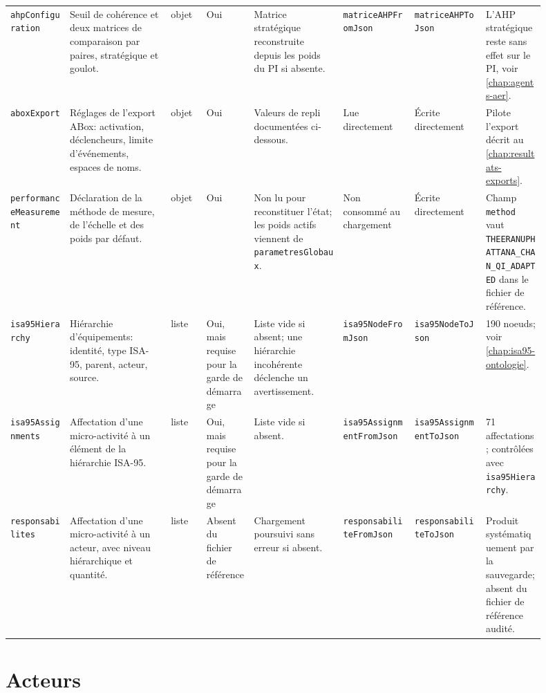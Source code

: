 \begin{landscape}
{\begin{longtable}{L{0.10\linewidth} L{0.17\linewidth} L{0.06\linewidth} L{0.08\linewidth} L{0.15\linewidth} L{0.12\linewidth} L{0.12\linewidth} L{0.10\linewidth}}
\texttt{ahp\allowbreak Configuration} & Seuil de cohérence et deux matrices de comparaison par paires, stratégique et goulot. & objet & Oui & Matrice stratégique reconstruite depuis les poids du PI si absente. & \texttt{matriceAHP\allowbreak FromJson} & \texttt{matriceAHP\allowbreak ToJson} & L'AHP stratégique reste sans effet sur le PI, voir \cref{chap:agents-aer}. \\
\texttt{aboxExport} & Réglages de l'export ABox: activation, déclencheurs, limite d'événements, espaces de noms. & objet & Oui & Valeurs de repli documentées ci-dessous. & Lue directement & Écrite directement & Pilote l'export décrit au \cref{chap:resultats-exports}. \\
\texttt{performance\allowbreak Measurement} & Déclaration de la méthode de mesure, de l'échelle et des poids par défaut. & objet & Oui & Non lu pour reconstituer l'état; les poids actifs viennent de \texttt{parametres\allowbreak Globaux}. & Non consommé au chargement & Écrite directement & Champ \texttt{method} vaut \texttt{THEERANUPHATTANA\_\allowbreak CHAN\_QI\_\allowbreak ADAPTED} dans le fichier de référence. \\
\texttt{isa95\allowbreak Hierarchy} & Hiérarchie d'équipements: identité, type ISA-95, parent, acteur, source. & liste & Oui, mais requise pour la garde de démarrage & Liste vide si absent; une hiérarchie incohérente déclenche un avertissement. & \texttt{isa95Node\allowbreak FromJson} & \texttt{isa95Node\allowbreak ToJson} & 190 noeuds; voir \cref{chap:isa95-ontologie}. \\
\texttt{isa95\allowbreak Assignments} & Affectation d'une micro-activité à un élément de la hiérarchie ISA-95. & liste & Oui, mais requise pour la garde de démarrage & Liste vide si absent. & \texttt{isa95Assignment\allowbreak FromJson} & \texttt{isa95Assignment\allowbreak ToJson} & 71 affectations; contrôlées avec \texttt{isa95Hierarchy}. \\
\texttt{responsa\allowbreak bilites} & Affectation d'une micro-activité à un acteur, avec niveau hiérarchique et quantité. & liste & Absent du fichier de référence & Chargement poursuivi sans erreur si absent. & \texttt{responsabilite\allowbreak FromJson} & \texttt{responsabilite\allowbreak ToJson} & Produit systématiquement par la sauvegarde; absent du fichier de référence audité. \\
\end{longtable}
}
\end{landscape}

\section{Acteurs}

